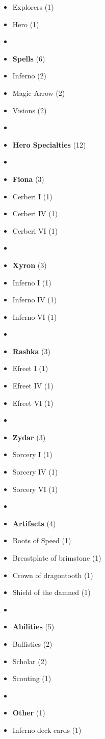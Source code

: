 \begin{multicols*}{3}
\begin{itemize}[leftmargin=0pt, label={}, noitemsep, noitemsep]
  \item Explorers (1)
  \item Hero (1)
  \item
  \item \textbf{Spells} (6)
  \item Inferno (2)
  \item Magic Arrow (2)
  \item Visions (2)
  \item
  \item \textbf{Hero Specialties} (12)
  \item
  \item \textbf{Fiona} (3)
  \item Cerberi I (1)
  \item Cerberi IV (1)
  \item Cerberi VI (1)
  \item
  \item \textbf{Xyron} (3)
  \item Inferno I (1)
  \item Inferno IV (1)
  \item Inferno VI (1)
  \item
  \item \textbf{Rashka} (3)
  \item Efreet I (1)
  \item Efreet IV (1)
  \item Efreet VI (1)
  \item
  \item \textbf{Zydar} (3)
  \item Sorcery I (1)
  \item Sorcery IV (1)
  \item Sorcery VI (1)
  \item
  \item \textbf{Artifacts} (4)
  \item Boots of Speed (1)
  \item Breastplate of brimstone (1)
  \item Crown of dragontooth (1)
  \item Shield of the damned (1)
  \item
  \item \textbf{Abilities} (5)
  \item Ballistics (2)
  \item Scholar (2)
  \item Scouting (1)
  \item
  \item \textbf{Other} (1)
  \item Inferno deck cards (1)
\end{itemize}

\end{multicols*}
